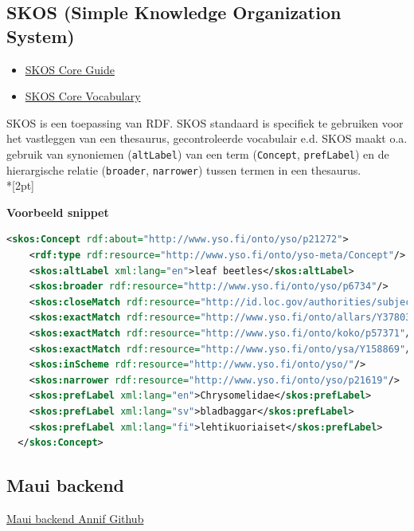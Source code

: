 \documentclass{article}
\begin{document}
\subsection{SKOS (Simple Knowledge Organization System)}

\begin{itemize}
  \item \href{https://www.w3.org/TR/2005/WD-swbp-skos-core-guide-20051102/}{SKOS Core Guide}
  \item \href{https://www.w3.org/TR/2005/WD-swbp-skos-core-spec-20051102/}{SKOS Core Vocabulary}
\end{itemize}

SKOS is een toepassing van RDF. SKOS standaard is specifiek te gebruiken voor het vastleggen van een thesaurus, gecontroleerde vocabulair e.d. SKOS maakt o.a. gebruik van synoniemen (\texttt{altLabel}) van een term (\texttt{Concept}, \texttt{prefLabel}) en de hierargische relatie (\texttt{broader}, \texttt{narrower}) tussen termen in een thesaurus.\\*[2pt]

\noindent
\textbf{Voorbeeld snippet}

\begin{lstlisting}[language=xml]
  <skos:Concept rdf:about="http://www.yso.fi/onto/yso/p21272">
    <rdf:type rdf:resource="http://www.yso.fi/onto/yso-meta/Concept"/>
    <skos:altLabel xml:lang="en">leaf beetles</skos:altLabel>
    <skos:broader rdf:resource="http://www.yso.fi/onto/yso/p6734"/>
    <skos:closeMatch rdf:resource="http://id.loc.gov/authorities/subjects/sh85025443"/>
    <skos:exactMatch rdf:resource="http://www.yso.fi/onto/allars/Y37803"/>
    <skos:exactMatch rdf:resource="http://www.yso.fi/onto/koko/p57371"/>
    <skos:exactMatch rdf:resource="http://www.yso.fi/onto/ysa/Y158869"/>
    <skos:inScheme rdf:resource="http://www.yso.fi/onto/yso/"/>
    <skos:narrower rdf:resource="http://www.yso.fi/onto/yso/p21619"/>
    <skos:prefLabel xml:lang="en">Chrysomelidae</skos:prefLabel>
    <skos:prefLabel xml:lang="sv">bladbaggar</skos:prefLabel>
    <skos:prefLabel xml:lang="fi">lehtikuoriaiset</skos:prefLabel>
  </skos:Concept>
\end{lstlisting}

\subsection{Maui backend}

\href{https://github.com/NatLibFi/Annif/wiki/Backend%3A-Maui}{Maui backend Annif Github}
\end{document}
